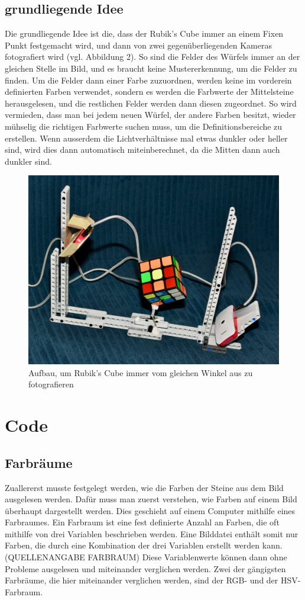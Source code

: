 \documentclass[a4paper, 12pt]{article}
\begin{document}
\subsection{grundliegende Idee}
Die grundliegende Idee ist die, dass der Rubik's Cube immer an einem Fixen Punkt festgemacht wird, und dann von zwei gegenüberliegenden Kameras fotografiert wird (vgl. Abbildung 2). So sind die Felder des Würfels immer an der gleichen Stelle im Bild, und es braucht keine Mustererkennung, um die Felder zu finden. Um die Felder dann einer Farbe zuzuordnen, werden keine im vorderein definierten Farben verwendet, sondern es werden die Farbwerte der Mittelsteine herausgelesen, und die restlichen Felder werden dann diesen zugeordnet. So wird vermieden, dass man bei jedem neuen Würfel, der andere Farben besitzt, wieder mühselig die richtigen Farbwerte suchen muss, um die Definitionsbereiche zu erstellen. Wenn ausserdem die Lichtverhältnisse  mal etwas dunkler oder heller sind, wird dies dann automatisch miteinberechnet, da die Mitten dann auch dunkler sind. 
\begin{figure}[H]
\includegraphics[scale=0.25]{Aufbau_Bild}
\caption{Aufbau, um Rubik's Cube immer vom gleichen Winkel aus zu fotografieren}
\end{figure}
\section{Code}
\subsection{Farbräume}
Zuallererst musste festgelegt werden, wie die Farben der Steine aus dem Bild ausgelesen werden. Dafür muss man zuerst verstehen, wie Farben auf einem Bild überhaupt dargestellt werden. Dies geschieht auf einem Computer mithilfe eines Farbraumes. Ein Farbraum ist eine fest definierte Anzahl an Farben, die oft mithilfe von drei Variablen beschrieben werden. Eine Bilddatei enthält somit nur Farben, die durch eine Kombination der drei Variablen erstellt werden kann.(QUELLENANGABE FARBRAUM) Diese Variablenwerte können dann ohne Probleme ausgelesen und miteinander verglichen werden. Zwei der gängigsten Farbräume, die hier miteinander verglichen werden, sind der RGB- und der HSV-Farbraum. 
\end{document}
